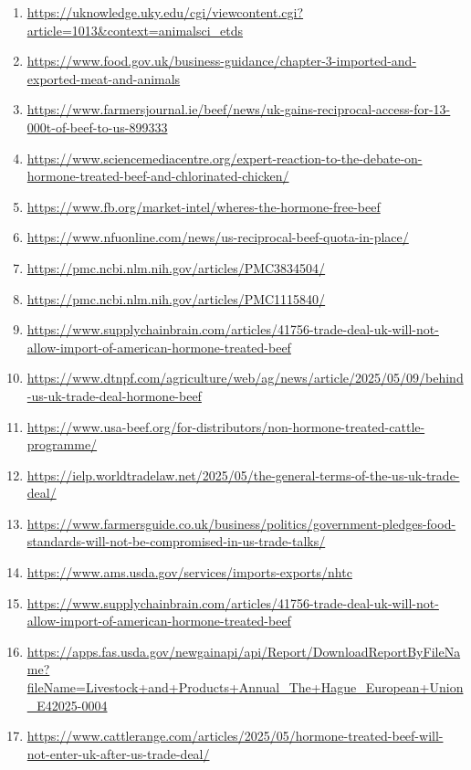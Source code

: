 \documentclass[10pt,a4paper]{article}
\begin{document}
\begin{enumerate}[leftmargin=*]
            \item \url{ https://uknowledge.uky.edu/cgi/viewcontent.cgi?article=1013\&context=animalsci\_etds }
            \item \url{ https://www.food.gov.uk/business-guidance/chapter-3-imported-and-exported-meat-and-animals }
            \item \url{ https://www.farmersjournal.ie/beef/news/uk-gains-reciprocal-access-for-13-000t-of-beef-to-us-899333 }
            \item \url{ https://www.sciencemediacentre.org/expert-reaction-to-the-debate-on-hormone-treated-beef-and-chlorinated-chicken/ }
            \item \url{ https://www.fb.org/market-intel/wheres-the-hormone-free-beef }
            \item \url{ https://www.nfuonline.com/news/us-reciprocal-beef-quota-in-place/ }
            \item \url{ https://pmc.ncbi.nlm.nih.gov/articles/PMC3834504/ }
            \item \url{ https://pmc.ncbi.nlm.nih.gov/articles/PMC1115840/ }
            \item \url{ https://www.supplychainbrain.com/articles/41756-trade-deal-uk-will-not-allow-import-of-american-hormone-treated-beef }
            \item \url{ https://www.dtnpf.com/agriculture/web/ag/news/article/2025/05/09/behind-us-uk-trade-deal-hormone-beef }
            \item \url{ https://www.usa-beef.org/for-distributors/non-hormone-treated-cattle-programme/ }
            \item \url{ https://ielp.worldtradelaw.net/2025/05/the-general-terms-of-the-us-uk-trade-deal/ }
            \item \url{ https://www.farmersguide.co.uk/business/politics/government-pledges-food-standards-will-not-be-compromised-in-us-trade-talks/ }
            \item \url{ https://www.ams.usda.gov/services/imports-exports/nhtc }
            \item \url{ https://www.supplychainbrain.com/articles/41756-trade-deal-uk-will-not-allow-import-of-american-hormone-treated-beef }
            \item \url{ https://apps.fas.usda.gov/newgainapi/api/Report/DownloadReportByFileName?fileName=Livestock+and+Products+Annual\_The+Hague\_European+Union\_E42025-0004 }
            \item \url{ https://www.cattlerange.com/articles/2025/05/hormone-treated-beef-will-not-enter-uk-after-us-trade-deal/ }

\end{enumerate}
\end{document}
